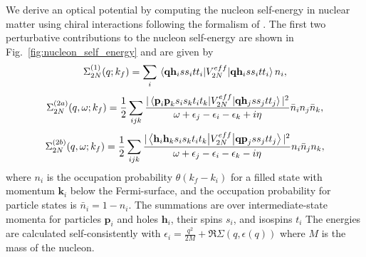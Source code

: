 \documentclass[preprintnumbers,floatfix,aps,prc,preprint,nofootinbib]{revtex4-1}
\begin{document}
We derive an optical potential by computing the nucleon self-energy in nuclear matter using chiral interactions following the formalism of \cite{Whitehead:2018bfs, Holt:2013tna}. The first two perturbative contributions to the nucleon self-energy are shown in Fig.~\ref{fig:nucleon_self_energy} and are given by
%
\begin{eqnarray}
	\label{eq:nucleon_self_energy_1}
	\Sigma_{2N}^{(1)} (q; k_f) = \sum_i \mel{\textbf{q} \textbf{h}_i s s_i t t_i}{V_{2N}^{eff}}{\textbf{q} \textbf{h}_i s s_i t t_i} n_i,
\end{eqnarray}
%
\begin{eqnarray}
	\label{eq:nucleon_self_energy_2a}
	\Sigma_{2N}^{(2a)} (q, \omega; k_f) = \frac{1}{2} \sum_{ijk} \frac{|\mel{\textbf{p}_i \textbf{p}_k s_i s_k t_i t_k}{V_{2N}^{eff}}{\textbf{q} \textbf{h}_j s s_j t t_j}|^2}{\omega+\epsilon_j-\epsilon_i-\epsilon_k+i \eta} \bar{n}_i n_j \bar{n}_k,
\end{eqnarray}
%
\begin{eqnarray}
	\label{eq:nucleon_self_energy_2b}
	\Sigma_{2N}^{(2b)} (q, \omega; k_f) = \frac{1}{2} \sum_{ijk} \frac{|\mel{\textbf{h}_i \textbf{h}_k s_i s_k t_i t_k}{V_{2N}^{eff}}{\textbf{q} \textbf{p}_j s s_j t t_j}|^2}{\omega+\epsilon_j-\epsilon_i-\epsilon_k-i \eta} n_i \bar{n}_j n_k,
\end{eqnarray}
%
where $n_i$ is the occupation probability $\theta(k_f - k_i)$ for a filled state with momentum $\textbf{k}_i$ below the Fermi-surface, and the occupation probability for particle states is $\bar{n}_i = 1 - n_i$. The summations are over intermediate-state momenta for particles $\textbf{p}_i$ and holes $\textbf{h}_i$, their spins $s_i$, and isospins $t_i$ The energies are calculated self-consistently with $\epsilon_i = \frac{q^2}{2 M} + \Re \Sigma(q, \epsilon(q))$ where $M$ is the mass of the nucleon.
\\
\end{document}
